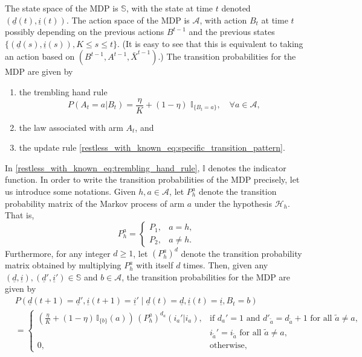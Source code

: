 The state space of the MDP is $\mathbb{S}$, with the state at time $t$ denoted $(\underline{d}(t), \underline{i}(t))$. The action space of the MDP is $\mathcal{A}$, with action $B_t$ at time $t$ possibly depending on the previous actions $B^{t-1}$ and the previous states $\{(\underline{d}(s), \underline{i}(s)), K \leq s \leq t\}$. (It is easy to see that this is equivalent to taking an action based on $(B^{t-1}, A^{t-1}, \bar{X}^{t-1})$.) The transition probabilities for the MDP are given by
\begin{enumerate}
	\item the trembling hand rule
\begin{equation}
	P(A_t = a | B_t) = \frac{\eta}{K}+ (1-\eta) \,\,\mathbb{I}_{\{B_t = a\}}, \quad \forall a \in \mathcal{A},\label{restless_with_known_eq:trembling_hand_rule}
\end{equation}
	\item the law associated with arm $A_t$, and
	\item the update rule \eqref{restless_with_known_eq:specific_transition_pattern}.
\end{enumerate}
In \eqref{restless_with_known_eq:trembling_hand_rule}, $\mathbb{I}$ denotes the indicator function. In order to write the transition probabilities of the MDP precisely, let us introduce some notations. Given $h,a\in\mathcal{A}$, let $P_h^a$ denote the transition probability matrix of the Markov process of arm $a$ under the hypothesis $\mathcal{H}_h$. That is,
\begin{equation}
	P_h^a=\begin{cases}
		P_1,&a=h,\\
		P_2,&a\neq h.
	\end{cases}\label{restless_with_known_eq:P_h^a}
\end{equation}
Furthermore, for any integer $d\geq 1$, let $(P_h^a)^d$ denote the transition probability matrix obtained by multiplying $P_h^a$ with itself $d$ times. Then, given any $(\underline{d},\underline{i}), (\underline{d}',\underline{i}')\in\mathbb{S}$ and $b\in\mathcal{A}$, the transition probabilities for the MDP are given by 
\begin{align}
	&P(\underline{d}(t+1)=\underline{d}',\underline{i}(t+1)=\underline{i}'\mid \underline{d}(t)=\underline{d},\underline{i}(t)=\underline{i}, B_t=b)\nonumber\\
	&=\begin{cases}
		\left(\frac{\eta}{K}+(1-\eta)\,\mathbb{I}_{\{b\}}(a)\right)\,(P_h^a)^{d_a}(i_a'|i_a),&\text{if }d_a'=1\text{ and }d'_{\tilde{a}}=d_{\tilde{a}}+1\text{ for all }\tilde{a}\neq a,\\
		&i_{\tilde{a}}'=i_{\tilde{a}}\text{ for all }\tilde{a}\neq a,\\
		0,&\text{otherwise},
	\end{cases}\label{restless_with_known_eq:MDP_transition_probabilities}
\end{align}
